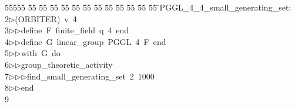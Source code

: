 %
%
\begin{tabbing}
55555 \= 55 \= 55 \= 55 \= 55 \= 55 \= 55 \= 55 \= 55 \= 55 \= 55 \= 55 \= 55 \= \>PGGL\_4\_4\_small\_generating\_set:\\[0pt]
2\>$\triangleright$\>(ORBITER)\ v\ 4\ \\[0pt]
3\>$\triangleright$\>$\triangleright$\>define\ F\ finite\_field\ q\ 4\ end\ \\[0pt]
4\>$\triangleright$\>$\triangleright$\>define\ G\ linear\_group\ PGGL\ 4\ F\ end\ \\[0pt]
5\>$\triangleright$\>$\triangleright$\>with\ G\ do\ \\[0pt]
6\>$\triangleright$\>$\triangleright$\>group\_theoretic\_activity\ \\[0pt]
7\>$\triangleright$\>$\triangleright$\>$\triangleright$\>find\_small\_generating\_set\ 2\ 1000\ \\[0pt]
8\>$\triangleright$\>$\triangleright$\>end\\[0pt]
9\>\end{tabbing}
